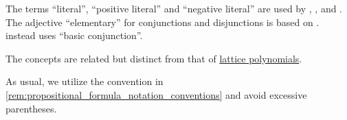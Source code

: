 \begin{comments}
  \item The terms \enquote{literal}, \enquote{positive literal} and \enquote{negative literal} are used by , ,  and . The adjective \enquote{elementary} for conjunctions and disjunctions is based on \cite[36]{Эдельман1975Логика}.  instead uses \enquote{basic conjunction}.
  \item The concepts are related but distinct from that of \hyperref[rem:lattice_polynomials]{lattice polynomials}.
  \item As usual, we utilize the convention in \cref{rem:propositional_formula_notation_conventions} and avoid excessive parentheses.
\end{comments}

